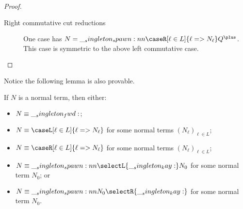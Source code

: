 \begin{proof}
\begin{description}
  \item[Right commutative cut reductions]
    One case has $N = \spawn{\caseR[\ell \in L]{\ell => N_{\ell}}}{Q^{\plus}}$.
    This case is symmetric to the above left commutative case.
    \qedhere
  \end{description}
\end{proof}


Notice the following lemma is also provable. 
\begin{lemma}
  If $N$ is a normal term, then either:
  \begin{itemize}[nosep]
  \item $N \equiv \__singleton_fwd:$;
  \item $N \equiv \caseL[\ell \in L]{\ell => N_{\ell}}$ for some normal terms $(N_{\ell})_{\ell \in L}$;
  \item $N \equiv \caseR[\ell \in L]{\ell => N_{\ell}}$ for some normal terms $(N_{\ell})_{\ell \in L}$;
  \item $N \equiv \spawn{\selectL{\kay}}{N_0}$ for some normal term $N_0$; or
  \item $N \equiv \spawn{N_0}{\selectR{\kay}}$ for some normal term $N_0$.
  \end{itemize}
\end{lemma}

